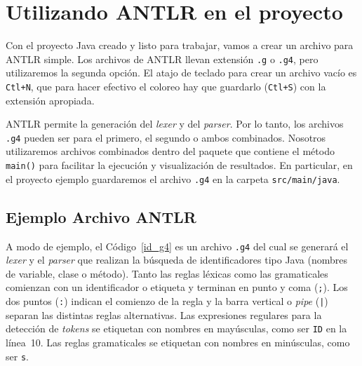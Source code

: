\section{Utilizando ANTLR en el proyecto}
\label{archivo_antlr}

Con el proyecto Java creado y listo para trabajar, vamos a crear un archivo para ANTLR simple. Los archivos de ANTLR llevan extensión \verb|.g| o \verb|.g4|, pero utilizaremos la segunda opción.  El atajo de teclado para crear un archivo vacío es \verb|Ctl+N|, que para hacer efectivo el coloreo hay que guardarlo (\verb|Ctl+S|) con la extensión apropiada.

ANTLR permite la generación del \emph{lexer} y del \emph{parser}.  Por lo tanto, los archivos \verb|.g4| pueden ser para el primero, el segundo o ambos combinados.  Nosotros utilizaremos archivos combinados dentro del paquete que contiene el método \verb|main()| para facilitar la ejecución y visualización de resultados.  En particular, en el proyecto ejemplo guardaremos el archivo \verb|.g4| en la carpeta \verb|src/main/java|.


\subsection{Ejemplo Archivo ANTLR}
\label{ejemplo_archivo_antlr}

A modo de ejemplo, el Código~\ref{id_g4} es un archivo \verb|.g4| del cual se generará el \emph{lexer} y el \emph{parser} que realizan la búsqueda de identificadores tipo Java (nombres de variable, clase o método).  Tanto las reglas léxicas como las gramaticales comienzan con un identificador o etiqueta y terminan en punto y coma (\verb|;|).  Los dos puntos (\verb|:|) indican el comienzo de la regla y la barra vertical o \emph{pipe} (\verb-|-) separan las distintas reglas alternativas.  Las expresiones regulares para la detección de \emph{tokens} se etiquetan con nombres en mayúsculas, como ser \verb|ID| en la línea~10.  Las reglas gramaticales se etiquetan con nombres en minúsculas, como ser \verb|s|.



